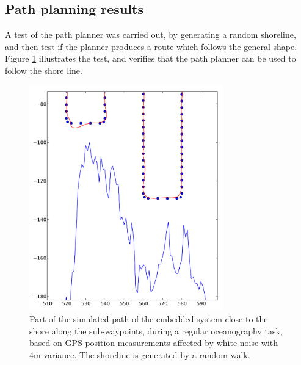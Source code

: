 \documentclass{ifacconf}
\begin{document}
\subsection{Path planning results}
A test of the path planner was carried out, by generating a random shoreline, and then test if the planner produces a route which follows the general shape. Figure \ref{fig:navi} illustrates the test, and verifies that the path planner can be used to follow the shore line. 
\begin{figure}
	\begin{center}
		\includegraphics[width=8.4cm]{img/Navi}    %
		\caption{Part of the simulated path of the embedded system close to the shore along the sub-waypoints, during a regular oceanography task, based on GPS position measurements affected by white noise with 4m variance. The shoreline is generated by a random walk.}  %
		\label{fig:navi}               
	\end{center}                                 %
\end{figure}
\end{document}
